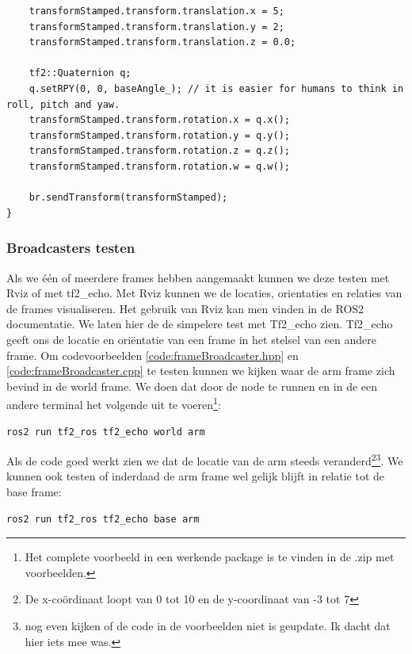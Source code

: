 \begin{lstlisting}
    transformStamped.transform.translation.x = 5;
    transformStamped.transform.translation.y = 2;
    transformStamped.transform.translation.z = 0.0;

    tf2::Quaternion q;
    q.setRPY(0, 0, baseAngle_); // it is easier for humans to think in roll, pitch and yaw.
    transformStamped.transform.rotation.x = q.x();
    transformStamped.transform.rotation.y = q.y();
    transformStamped.transform.rotation.z = q.z();
    transformStamped.transform.rotation.w = q.w();

    br.sendTransform(transformStamped);
}

\end{lstlisting}

\subsubsection{Broadcasters testen}
\label{sec:broadcastersTesten}
Als we \'e\'en of meerdere frames hebben aangemaakt kunnen we deze testen met Rviz of met tf2\_echo. Met Rviz kunnen we de locaties, orientaties en relaties van de frames visualiseren. Het gebruik van Rviz kan men vinden in de ROS2 documentatie. We laten hier de de simpelere test met Tf2\_echo zien. Tf2\_echo geeft ons de locatie en oriëntatie van een frame in het stelsel van een andere frame. Om codevoorbeelden \ref{code:frameBroadcaster.hpp} en \ref{code:frameBroadcaster.cpp} te testen kunnen we kijken waar de arm frame zich bevind in de world frame. We doen dat door de node te runnen en in de een andere terminal het volgende uit te voeren\footnote{Het complete voorbeeld in een werkende package is te vinden in de .zip met voorbeelden.}:

\begin{lstlisting}[style=DOS, caption={}, firstnumber=0, label={}]
ros2 run tf2_ros tf2_echo world arm
\end{lstlisting}

\noindent Als de code goed werkt zien we dat de locatie van de arm steeds veranderd\footnote{De x-coördinaat loopt van 0 tot 10 en de y-coordinaat van -3 tot 7}\footnote{nog even kijken of de code in de voorbeelden niet is geupdate. Ik dacht dat hier iets mee was.}. We kunnen ook testen of inderdaad de arm frame wel gelijk blijft in relatie tot de base frame:

\begin{lstlisting}[style=DOS, caption=Hello world, firstnumber=0, label={}]
ros2 run tf2_ros tf2_echo base arm
\end{lstlisting}

